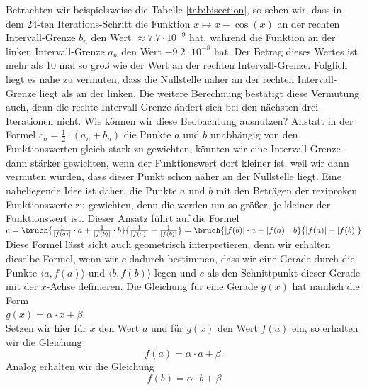 Betrachten wir beispielsweise die Tabelle \ref{tab:bisection}, so sehen wir, dass
in dem 24-ten Iterations-Schritt die Funktion $x \mapsto x - \cos(x)$ an der rechten
Intervall-Grenze $b_n$ den Wert $\approx 7.7 \cdot 10^{-9}$ hat, w\"ahrend die Funktion an der
linken Intervall-Grenze $a_n$ den Wert $-9.2 \cdot 10^{-8}$ hat.  Der Betrag dieses Wertes ist
mehr als 10 mal so gro{\ss} wie der Wert an der rechten Intervall-Grenze.  Folglich liegt es
nahe zu vermuten, dass die Nullstelle n\"aher an der rechten Intervall-Grenze liegt als an
der linken.  Die weitere Berechnung best\"atigt diese Vermutung auch, denn die rechte
Intervall-Grenze \"andert sich bei den n\"achsten drei Iterationen nicht.  Wie k\"onnen wir
diese Beobachtung ausnutzen?  Anstatt in der Formel $c_n = \frac{1}{2}\cdot(a_n + b_n)$ die
Punkte $a$ und $b$ unabh\"angig von den Funktionswerten gleich stark zu gewichten, k\"onnten
wir eine Intervall-Grenze dann st\"arker gewichten, wenn der Funktionswert dort kleiner ist,
weil wir dann vermuten w\"urden, dass dieser Punkt schon n\"aher an der Nullstelle liegt.
Eine naheliegende Idee ist daher, die Punkte $a$ und $b$ mit den Betr\"agen der reziproken
Funktionswerte zu gewichten, denn die werden um so gr\"o{\ss}er, je kleiner der Funktionswert
ist.  Dieser Ansatz f\"uhrt auf die Formel
\\[0.2cm]
\hspace*{1.3cm} $c = \bruch{\frac{1}{|f(a)|}\cdot a + \frac{1}{|f(b)|}\cdot b}{\frac{1}{|f(a)|} +
  \frac{1}{|f(b)|}} = \bruch{|f(b)|\cdot a + |f(a)|\cdot b}{|f(a)| + |f(b)|}$
\\[0.3cm]
Diese Formel l\"asst sicht auch geometrisch interpretieren, denn wir erhalten dieselbe Formel, wenn
wir $c$ dadurch bestimmen, dass wir eine Gerade durch die Punkte $\bigl\langle a, f(a)\bigr\rangle$ und $\bigl\langle b, f(b)\bigr\rangle$ legen und
$c$ als den Schnittpunkt dieser Gerade mit der $x$-Achse definieren.  Die Gleichung f\"ur eine
Gerade $g(x)$ hat n\"amlich die Form
\\[0.2cm]
\hspace*{1.3cm} $g(x) = \alpha \cdot x + \beta$.
\\[0.2cm]
Setzen wir hier f\"ur $x$ den Wert $a$ und f\"ur $g(x)$ den Wert $f(a)$ ein, so erhalten wir
die Gleichung
\begin{equation}
  \label{eq:null0}
  f(a) = \alpha \cdot a + \beta.
\end{equation}
Analog erhalten wir die Gleichung
\begin{equation}
  \label{eq:null1}
  f(b) = \alpha \cdot b + \beta
\end{equation}
